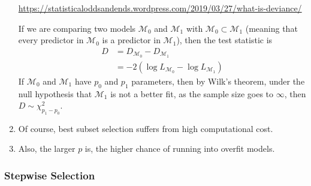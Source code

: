 \documentclass[10pt]{article}
\begin{document}
\begin{enumerate}
{	\url{https://statisticaloddsandends.wordpress.com/2019/03/27/what-is-deviance/}
	
	If we are comparing two models $\mathcal{M}_0$ and $\mathcal{M}_1$ with $\mathcal{M}_0 \subset \mathcal{M}_1$ (meaning that every predictor in $\mathcal{M}_0$ is a predictor in $\mathcal{M}_1$), then the test statistic is 
	\begin{align*}
		D &= D_{\mathcal{M}_0} - D_{\mathcal{M}_1} \\
		&= -2(\log L_{\mathcal{M}_0} - \log L_{\mathcal{M}_1})
	\end{align*} 
	If $\mathcal{M}_0$ and $\mathcal{M}_1$ have $p_0$ and $p_1$ parameters, then by Wilk's theorem, under the null hypothesis that $\mathcal{M}_1$ is not a better fit, as the sample size goes to $\infty$, then $D \sim \chi^2_{p_1 - p_0}$.}

	\item Of course, best subset selection suffers from high computational cost.
	\item Also, the larger $p$ is, the higher chance of running into overfit models.
\end{enumerate}

\subsubsection{Stepwise Selection} 
\end{document}

